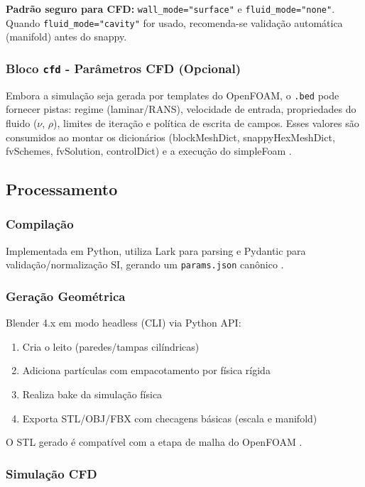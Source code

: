 \textbf{Padrão seguro para CFD:} \texttt{wall\_mode="surface"} e \texttt{fluid\_mode="none"}. Quando \texttt{fluid\_mode="cavity"} for usado, recomenda-se validação automática (manifold) antes do snappy.

\subsubsection{Bloco \texttt{cfd} - Parâmetros CFD (Opcional)}

Embora a simulação seja gerada por templates do OpenFOAM, o \texttt{.bed} pode fornecer pistas: regime (laminar/RANS), velocidade de entrada, propriedades do fluido ($\nu$, $\rho$), limites de iteração e política de escrita de campos. Esses valores são consumidos ao montar os dicionários (blockMeshDict, snappyHexMeshDict, fvSchemes, fvSolution, controlDict) e a execução do simpleFoam \cite{openfoam2023}.

\subsection{Processamento}

\subsubsection{Compilação}

Implementada em Python, utiliza Lark para parsing e Pydantic para validação/normalização SI, gerando um \texttt{params.json} canônico \cite{fowler2010, lark2021, pydantic2021}.

\subsubsection{Geração Geométrica}

Blender 4.x em modo headless (CLI) via Python API:
\begin{enumerate}
    \item Cria o leito (paredes/tampas cilíndricas)
    \item Adiciona partículas com empacotamento por física rígida
    \item Realiza bake da simulação física
    \item Exporta STL/OBJ/FBX com checagens básicas (escala e manifold)
\end{enumerate}

O STL gerado é compatível com a etapa de malha do OpenFOAM \cite{blender2021}.

\subsubsection{Simulação CFD}


